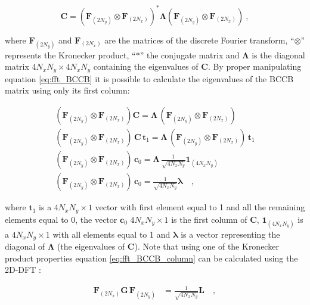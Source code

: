 \documentclass[manuscript,revised]{geophysics}
\begin{document}
\begin{equation}
\mathbf{C} = \left(\mathbf{F}_{(2N_y)} \otimes \mathbf{F}_{(2N_x)} \right)^{\ast} \mathbf{\Lambda}\left( \mathbf{F}_{(2N_y)} \otimes \mathbf{F}_{(2N_x)} \right) \: ,
\label{eq:fft_BCCB}
\end{equation}

\noindent where $\mathbf{F}_{(2N_y)}$ and $\mathbf{F}_{(2N_x)}$ are the matrices of the discrete Fourier transform, ``$\otimes$'' represents the Kronecker product, ``$\ast$'' the conjugate matrix and $\mathbf{\Lambda}$ is the diagonal matrix $4N_xN_y \times 4N_xN_y$ containing the eigenvalues of $\mathbf{C}$. By proper manipulating equation \ref{eq:fft_BCCB} it is possible to calculate the eigenvalues of the BCCB matrix using only its first column:

\begin{eqnarray}
\left( \mathbf{F}_{(2N_y)} \otimes \mathbf{F}_{(2N_x)} \right) \mathbf{C} = \mathbf{\Lambda} \, \left( \mathbf{F}_{(2N_y)} \otimes \mathbf{F}_{(2N_x)} \right) \\
\left( \mathbf{F}_{(2N_y)} \otimes \mathbf{F}_{(2N_x)} \right) \, \mathbf{C} \, \mathbf{t}_{1} = \mathbf{\Lambda} \, \left( \mathbf{F}_{(2N_y)} \otimes \mathbf{F}_{(2N_x)} \right) \, \mathbf{t}_{1} \\
\left( \mathbf{F}_{(2N_y)} \otimes \mathbf{F}_{(2N_x)} \right) \, \mathbf{c}_{0} = \mathbf{\Lambda} \, \frac{1}{\sqrt{4N_xN_y}}\mathbf{1}_{(4N_xN_y)} \\
\left( \mathbf{F}_{(2N_y)} \otimes \mathbf{F}_{(2N_x)} \right) \, \mathbf{c}_{0} = \frac{1}{\sqrt{4N_xN_y}} \mathbf{\lambda} \quad ,
\label{eq:fft_BCCB_column}
\end{eqnarray}

\noindent where $\mathbf{t}_{1}$ is a $4N_xN_y \times 1$ vector with first element equal to 1 and all the remaining elements equal to 0, the vector $\mathbf{c}_{0}$ $4N_xN_y \times 1$ is the first column of $\mathbf{C}$, $\mathbf{1}_{(4N_xN_y)}$ is a $4N_xN_y \times 1$ with all elements equal to 1 and $\mathbf{\lambda}$ is a vector representing the diagonal of $\mathbf{\Lambda}$ (the eigenvalues of $\mathbf{C}$). Note that using one of the Kronecker product properties equation \ref{eq:fft_BCCB_column} can be calculated using the 2D-DFT \citep{jain1989}:

\begin{eqnarray}
\mathbf{F}_{(2N_x)} \mathbf{G} \, \mathbf{F}_{(2N_y)} &= \frac{1}{\sqrt{4N_xN_y}} \mathbf{L}
\quad ,
\label{eq:fft_BCCB_column_2D}
\end{eqnarray}
\end{document}
